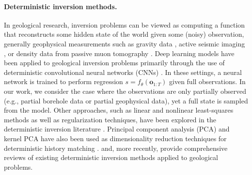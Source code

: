 \paragraph{Deterministic inversion methods.}
In geological research, inversion problems \cite{tarantola1987inverse} can be viewed as computing a function that reconstructs some hidden state of the world given some (noisy) observation, generally geophysical measurements such as gravity data \cite{huang2021deep}, active seismic imaging \cite{deng2022openfwi}, or density data from passive muon tomography \cite{lechmann2021muon}.
Deep learning models have been applied to geological inversion problems primarily through the use of deterministic convolutional neural networks (CNNs) \cite{puzyrev2019deep,hu2021inversion}.
In these settings, a neural network is trained to perform regression $s = f_\theta(\mathbf{o}_{1:T})$ given full observations.
In our work, we consider the case where the observations are only partially observed (e.g., partial borehole data or partial geophysical data), yet a full state is sampled from the model.
Other approaches, such as linear and nonlinear least-squares methods as well as regularization techniques, have been explored in the deterministic inversion literature \cite{menke1989geophysical,tikhonov1963solution,constable1987occam,parker1994geophysical}.
Principal component analysis (PCA) and kernel PCA have also been used as dimensionality reduction techniques for deterministic history matching \cite{reynolds1996reparameterization,esmaeili2020kernel}.
\textcite{tarantola2005inverse} and, more recently, \textcite{zhdanov2015geophysical} provide comprehensive reviews of existing deterministic inversion methods applied to geological problems.


